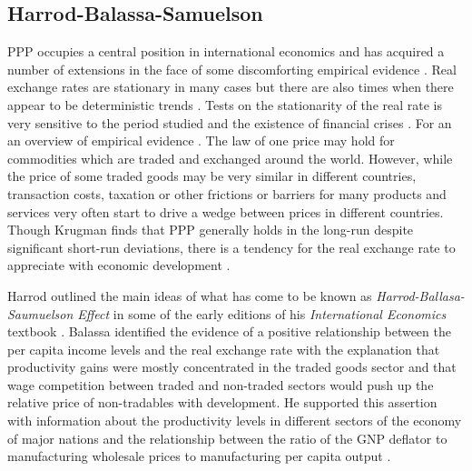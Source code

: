 \documentclass[12pt, a4paper, oneside]{article}\usepackage[]{graphicx}\usepackage[]{color}
\begin{document}
\subsection{Harrod-Balassa-Samuelson}\label{secref:HBS}
PPP occupies a central position in international economics and has acquired a number of extensions in the face of some discomforting empirical evidence \citep{TaylorPPP}.   Real exchange rates are stationary in many cases but there are also times when there appear to be deterministic trends \citep{Froot1995Purchasing}.  Tests on the stationarity of the real rate is very sensitive to the period studied and the existence of financial crises \citep{ZhouKutanPPP}.  For an an overview of empirical evidence \citep{Taylor2004Purchasing}.    The law of one price may hold for commodities which are traded and exchanged around the world.  However, while the price of some traded goods may be very similar in different countries, transaction costs, taxation or other frictions or barriers for many products and services very often start to drive a wedge between prices in different countries.  Though  Krugman  finds that PPP generally holds in the long-run despite significant short-run deviations, there is a tendency for the real exchange rate to appreciate with economic development \citep{Krugman1978PPP}.  


Harrod outlined the main ideas of what has come to be known as \emph{Harrod-Ballasa-Saumuelson Effect} in some of the early editions of his \emph{International Economics} textbook \citep{Harrod1933International}.  Balassa identified the evidence of a positive relationship between the per capita income levels and the real exchange rate with the explanation that productivity gains were mostly concentrated in the traded goods sector and that wage competition between traded and non-traded sectors would push up the relative price of non-tradables with development.  He supported this assertion with information about the productivity levels in different sectors of the economy of major nations and the relationship between the ratio of the GNP deflator to manufacturing wholesale prices to manufacturing per capita output  \citep{Balassa1964PPP}.  
\end{document}
